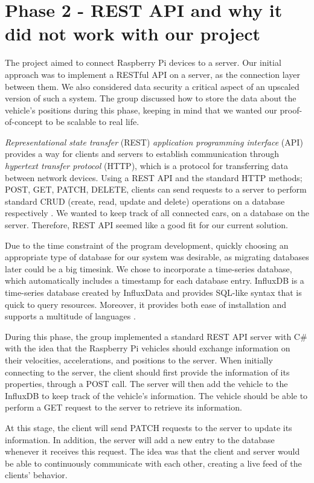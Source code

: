 
\section{Phase 2 - REST API and why it did not work with our project}\label{phase2}
The project aimed to connect Raspberry Pi devices to a server.  Our initial approach was to implement a RESTful API on a server, as the connection layer between them. We also considered data security a critical aspect of an upscaled version of such a system. The group discussed how to store the data about the vehicle's positions during this phase, keeping in mind that we wanted our proof-of-concept to be scalable to real life.

\emph{Representational state transfer} (REST) \emph{application programming interface} (API) provides a way for clients and servers to establish communication through \emph{hypertext transfer protocol} (HTTP), which is a protocol for transferring data between network devices. Using a REST API and the standard HTTP methods; POST, GET, PATCH, DELETE, clients can send requests to a server to perform standard CRUD (create, read, update and delete) operations on a database respectively \parencite{rest_api}. We wanted to keep track of all connected cars, on a database on the server. Therefore, REST API seemed like a good fit for our current solution.

Due to the time constraint of the program development, quickly choosing an appropriate type of database for our system was desirable, as migrating databases later could be a big timesink. We chose to incorporate a time-series database, which automatically includes a timestamp for each database entry. InfluxDB is a time-series database created by InfluxData and provides SQL-like syntax that is quick to query resources. Moreover, it provides both ease of installation and supports a multitude of languages \parencite{influxdb}.

During this phase, the group implemented a standard REST API server with C\# with the idea that the Raspberry Pi vehicles should exchange information on their velocities, accelerations, and positions to the server. When initially connecting to the server, the client should first provide the information of its properties, through a POST call. The server will then add the vehicle to the InfluxDB to keep track of the vehicle's information. The vehicle should be able to perform a GET request to the server to retrieve its information.

At this stage, the client will send PATCH requests to the server to update its information. In addition, the server will add a new entry to the database whenever it receives this request. The idea was that the client and server would be able to continuously communicate with each other, creating a live feed of the clients' behavior.

